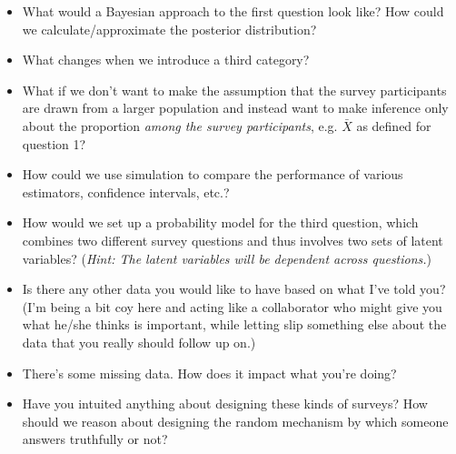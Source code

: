 \documentclass[11pt, oneside]{article}   	%
\begin{document}
\begin{itemize}
\item What would a Bayesian approach to the first question look like? How could we calculate/approximate the posterior distribution?
\item What changes when we introduce a third category?
\item What if we don't want to make the assumption that the survey participants are drawn from a larger population and instead want to make inference only about the proportion {\em among the survey participants}, e.g. $\bar{X}$ as defined for question 1? 
\item How could we use simulation to compare the performance of various estimators, confidence intervals, etc.?
\item How would we set up a probability model for the third question, which combines two different survey questions and thus involves two sets of latent variables? ({\em Hint: The latent variables will be dependent across questions.})
\item Is there any other data you would like to have based on what I've told you? (I'm being a bit coy here and acting like a collaborator who might give you what he/she thinks is important, while letting slip something else about the data that you really should follow up on.)
\item There's some missing data. How does it impact what you're doing?
\item Have you intuited anything about designing these kinds of surveys? How should we reason about designing the random mechanism by which someone answers truthfully or not?
\end{itemize}
\end{document}
